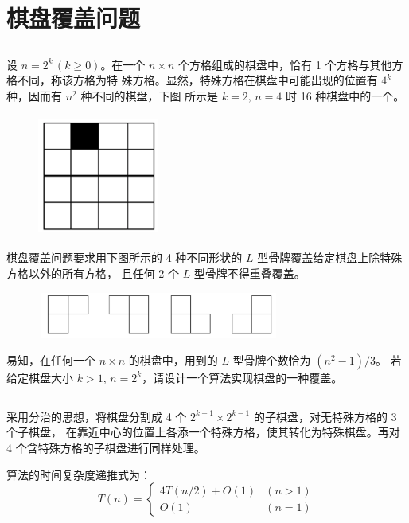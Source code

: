 \section{棋盘覆盖问题}

\subsection*{}
设 $n=2^k\,(k\geqslant0)$。在一个 $n×n$ 个方格组成的棋盘中，恰有 1 个方格与其他方格不同，称该方格为特
殊方格。显然，特殊方格在棋盘中可能出现的位置有 $4^k$ 种，因而有 $n^2$ 种不同的棋盘，下图
所示是 $k=2,\,n=4$ 时 16 种棋盘中的一个。
\begin{figure}[htbp]
    \centering
    \includegraphics[width=4cm, height=4cm]{figure/chesstable.png}
  \end{figure} 
棋盘覆盖问题要求用下图所示的 4 种不同形状的 $L$ 型骨牌覆盖给定棋盘上除特殊方格以外的所有方格，
且任何 2 个 $L$ 型骨牌不得重叠覆盖。

\begin{figure}[htbp]
  \centering
  \includegraphics[width=8cm, height=1.5cm]{figure/chesstable2.png}
\end{figure} 

易知，在任何一个 $n×n$ 的棋盘中，用到的 $L$ 型骨牌个数恰为 $(n^2-1)/3$。
若给定棋盘大小 $k>1,\,n=2^k$，请设计一个算法实现棋盘的一种覆盖。

\subsection*{}
采用分治的思想，将棋盘分割成 4 个 $2^{k-1}×2^{k-1}$ 的子棋盘，对无特殊方格的 3 个子棋盘，
在靠近中心的位置上各添一个特殊方格，使其转化为特殊棋盘。再对 4 个含特殊方格的子棋盘进行同样处理。

算法的时间复杂度递推式为：
\[ T(n) = \left\{
\begin{array}{lr}
4T(n/2)+O(1) & (n>1) \\
O(1) & (n=1)
\end{array} \right. \]

